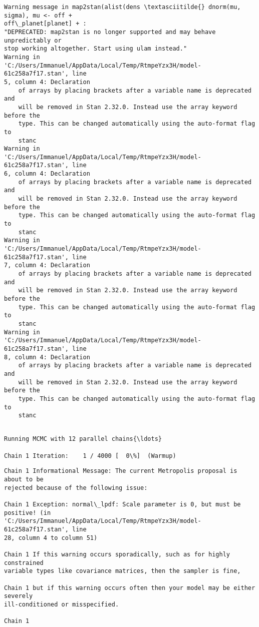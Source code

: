 \documentclass[11pt]{article}
\begin{document}
    \begin{Verbatim}[commandchars=\\\{\}]
Warning message in map2stan(alist(dens \textasciitilde{} dnorm(mu, sigma), mu <- off +
off\_planet[planet] + :
"DEPRECATED: map2stan is no longer supported and may behave unpredictably or
stop working altogether. Start using ulam instead."
Warning in
'C:/Users/Immanuel/AppData/Local/Temp/RtmpeYzx3H/model-61c258a7f17.stan', line
5, column 4: Declaration
    of arrays by placing brackets after a variable name is deprecated and
    will be removed in Stan 2.32.0. Instead use the array keyword before the
    type. This can be changed automatically using the auto-format flag to
    stanc
Warning in
'C:/Users/Immanuel/AppData/Local/Temp/RtmpeYzx3H/model-61c258a7f17.stan', line
6, column 4: Declaration
    of arrays by placing brackets after a variable name is deprecated and
    will be removed in Stan 2.32.0. Instead use the array keyword before the
    type. This can be changed automatically using the auto-format flag to
    stanc
Warning in
'C:/Users/Immanuel/AppData/Local/Temp/RtmpeYzx3H/model-61c258a7f17.stan', line
7, column 4: Declaration
    of arrays by placing brackets after a variable name is deprecated and
    will be removed in Stan 2.32.0. Instead use the array keyword before the
    type. This can be changed automatically using the auto-format flag to
    stanc
Warning in
'C:/Users/Immanuel/AppData/Local/Temp/RtmpeYzx3H/model-61c258a7f17.stan', line
8, column 4: Declaration
    of arrays by placing brackets after a variable name is deprecated and
    will be removed in Stan 2.32.0. Instead use the array keyword before the
    type. This can be changed automatically using the auto-format flag to
    stanc


    \end{Verbatim}

    \begin{Verbatim}[commandchars=\\\{\}]
Running MCMC with 12 parallel chains{\ldots}

Chain 1 Iteration:    1 / 4000 [  0\%]  (Warmup)
    \end{Verbatim}

    \begin{Verbatim}[commandchars=\\\{\}]
Chain 1 Informational Message: The current Metropolis proposal is about to be
rejected because of the following issue:

Chain 1 Exception: normal\_lpdf: Scale parameter is 0, but must be positive! (in
'C:/Users/Immanuel/AppData/Local/Temp/RtmpeYzx3H/model-61c258a7f17.stan', line
28, column 4 to column 51)

Chain 1 If this warning occurs sporadically, such as for highly constrained
variable types like covariance matrices, then the sampler is fine,

Chain 1 but if this warning occurs often then your model may be either severely
ill-conditioned or misspecified.

Chain 1

    \end{Verbatim}
\end{document}
